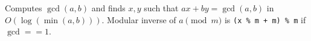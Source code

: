 
Computes $\gcd(a, b)$ and finds $x, y$ such that $ax + by = \gcd(a, b)$ in $O(\log(\min(a, b)))$. Modular inverse of $a \pmod m$ is \lstinline|(x % m + m) % m| if $\gcd == 1$.


